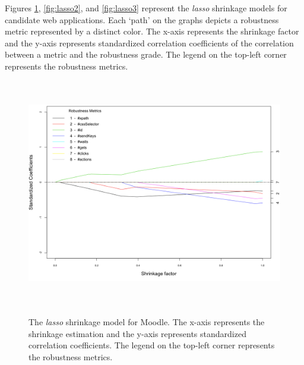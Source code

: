 Figures \ref{fig:lasso1}, \ref{fig:lasso2}, and \ref{fig:lasso3} represent the \textit{lasso} shrinkage models for candidate web applications. Each `path' on the graphs depicts a robustness metric represented by a distinct color. The x-axis represents the shrinkage factor and the y-axis represents standardized correlation coefficients of the correlation between a metric and the robustness grade. The legend on the top-left corner represents the robustness metrics.







\begin{figure}[t] 
\centering     %
{\label{fig:moodlelasso}\includegraphics[width=13cm,height=10cm]{./Figures/moodlelasso}}
  \captionsetup{justification=justified,
singlelinecheck=false}
\caption{The \textit{lasso} shrinkage model for Moodle. The x-axis represents the shrinkage estimation and the y-axis represents standardized correlation coefficients. The legend on the top-left corner represents the robustness metrics.}
\label{fig:lasso1}
\end{figure} 

